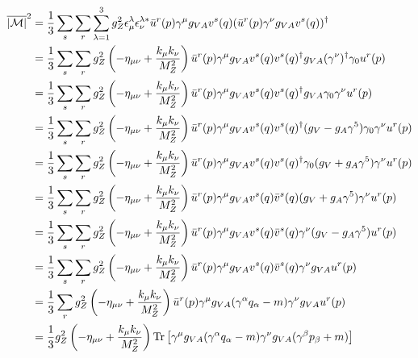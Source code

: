 \documentclass[12pt,a4]{article}
\begin{document}
\begin{enumerate}
\begin{enumerate}
\begin{align*}
          \overline{|\mathcal{M}|}^2 
                                   &= \frac{1}{3}\sum_{s}\sum_{r}\sum_{\lambda = 1}^{3} g_Z^2 \epsilon_\mu^\lambda \epsilon_\nu^{\lambda *} \bar{u}^r(p) \gamma^\mu g_{V A} v^s(q) ( \bar{u}^r(p) \gamma^\nu g_{V A} v^s(q))^\dagger\\
                                   &= \frac{1}{3}\sum_{s}\sum_{r}g_Z^2 \left(- \eta_{\mu \nu} + \frac{k_\mu k_\nu}{M_Z^2}\right) \bar{u}^r(p) \gamma^\mu g_{V A} v^s(q) v^s(q)^\dagger g_{V A} (\gamma^\nu)^\dagger \gamma_0 u^r(p)   \\
                                   &= \frac{1}{3}\sum_{s}\sum_{r}g_Z^2 \left(- \eta_{\mu \nu} + \frac{k_\mu k_\nu}{M_Z^2}\right) \bar{u}^r(p) \gamma^\mu g_{V A} v^s(q) v^s(q)^\dagger g_{V A} \gamma_0 \gamma^\nu  u^r(p)   \\
                                   &= \frac{1}{3}\sum_{s}\sum_{r}g_Z^2 \left(- \eta_{\mu \nu} + \frac{k_\mu k_\nu}{M_Z^2}\right) \bar{u}^r(p) \gamma^\mu g_{V A} v^s(q) v^s(q)^\dagger (g_{V } - g_A \gamma^5) \gamma_0 \gamma^\nu  u^r(p)   \\
                                   &= \frac{1}{3}\sum_{s}\sum_{r}g_Z^2 \left(- \eta_{\mu \nu} + \frac{k_\mu k_\nu}{M_Z^2}\right) \bar{u}^r(p) \gamma^\mu g_{V A} v^s(q) v^s(q)^\dagger\gamma_0 (g_{V } + g_A \gamma^5)  \gamma^\nu  u^r(p)   \\
                                   &= \frac{1}{3}\sum_{s}\sum_{r}g_Z^2 \left(- \eta_{\mu \nu} + \frac{k_\mu k_\nu}{M_Z^2}\right) \bar{u}^r(p) \gamma^\mu g_{V A} v^s(q) \bar{v}^s(q) (g_{V } + g_A \gamma^5)  \gamma^\nu  u^r(p)   \\
                                   &= \frac{1}{3}\sum_{s}\sum_{r}g_Z^2 \left(- \eta_{\mu \nu} + \frac{k_\mu k_\nu}{M_Z^2}\right) \bar{u}^r(p) \gamma^\mu g_{V A} v^s(q) \bar{v}^s(q) \gamma^\nu (g_{V } - g_A \gamma^5)    u^r(p)   \\
                                   &= \frac{1}{3}\sum_{s}\sum_{r}g_Z^2 \left(- \eta_{\mu \nu} + \frac{k_\mu k_\nu}{M_Z^2}\right) \bar{u}^r(p) \gamma^\mu g_{V A} v^s(q) \bar{v}^s(q) \gamma^\nu g_{V A}   u^r(p)   \\
                                   &= \frac{1}{3}\sum_{r}g_Z^2 \left(- \eta_{\mu \nu} + \frac{k_\mu k_\nu}{M_Z^2}\right) \bar{u}^r(p) \gamma^\mu g_{V A} (\gamma^\alpha q_\alpha - m) \gamma^\nu g_{V A}   u^r(p)   \\
                                   &= \frac{1}{3}g_Z^2 \left(- \eta_{\mu \nu} + \frac{k_\mu k_\nu}{M_Z^2}\right) \Tr\left[ \gamma^\mu g_{V A} (\gamma^\alpha q_\alpha - m) \gamma^\nu g_{V A}   (\gamma^\beta p_\beta +m)\right] 

\end{align*}
\end{enumerate}
\end{enumerate}
\end{document}
